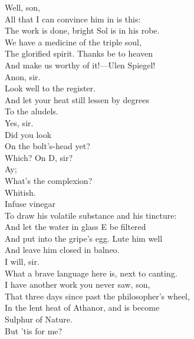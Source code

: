 \documentclass[a4paper,oneside,12pt]{memoir}
\begin{document}
\begin{drama*}
\subtlespeaks {} Well, son,\\
All that I can convince him in is this:\\
The work is done, bright Sol is in his robe.\\
We have a medicine of the triple soul,\\
The glorified spirit. Thanks be to heaven\\
And make us worthy of it!---Ulen Spiegel!\\
\facespeaks {} Anon, sir.\\
\subtlespeaks {} Look well to the register.\\
And let your heat still lessen by degrees\\
To the aludels.\\
\facespeaks {} Yes, sir.\\
\subtlespeaks {} Did you look\\
On the bolt's-head yet?\\
\facespeaks {} Which? On D, sir?\\
\subtlespeaks {} Ay;\\
What's the complexion?\\
\facespeaks {} Whitish.\\
\subtlespeaks {} Infuse vinegar\\
To draw his volatile substance and his tincture:\\
And let the water in glass E be filtered\\
And put into the gripe's egg. Lute him well\\
And leave him closed in balneo.\\
\facespeaks {} I will, sir.\\
\surlyspeaks What a brave language here is, next to canting.\\
\subtlespeaks I have another work you never saw, son,\\
That three days since past the philosopher's wheel,\\
In the lent heat of Athanor, and is become\\
Sulphur of Nature.\\
\mammonspeaks {} But 'tis for me?\\

\end{drama*}
\end{document}

